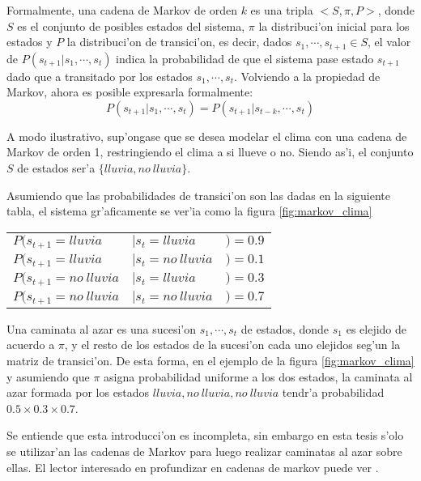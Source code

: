 Formalmente, una cadena de Markov de orden $k$ es una tripla $<S,\pi, P>$, donde $S$ es el conjunto de posibles estados del sistema, $\pi$ la distribuci'on
inicial para los estados y $P$ la 
distribuci'on de transici'on, es decir, dados $s_1, \cdots, s_{t+1} \in S$, el valor de $P(s_{t+1} | s_1, \cdots, s_t)$ indica la probabilidad
de que el sistema pase estado $s_{t+1}$ dado que a transitado por los estados $s_1, \cdots, s_t$. 
Volviendo a la propiedad de Markov, ahora es posible expresarla formalmente: $$P(s_{t+1}|s_1,\cdots,s_t) = P(s_{t+1} | s_{t-k}, \cdots, s_t)$$

A modo ilustrativo, sup'ongase que se desea modelar el clima con una cadena de Markov de orden 1, restringiendo el clima a si llueve o no. Siendo as'i, el conjunto 
$S$ de estados ser'a $\{lluvia, no\ lluvia\}$. 

Asumiendo que las probabilidades de transici'on son las dadas en la siguiente tabla, el sistema gr'aficamente se ver'ia como la figura \ref{fig:markov_clima}

\begin{center}
\label{tabla_markov}
\begin{tabular}{l l l}
$P(s_{t+1} = lluvia $ & $| s_t = lluvia $ & $)=0.9$ \\
$P(s_{t+1} = lluvia $ & $|s_t= no\ lluvia $& $)=0.1$\\
$P(s_{t+1} = no\ lluvia $ & $| s_t= lluvia  $ & $)=0.3$ \\
$P(s_{t+1} = no\ lluvia $ & $|s_t= no\ lluvia $ & $)=0.7$\\
\end{tabular}
\end{center}

\begin{imagen}
    \width{5cm}
\end{imagen}

Una caminata al azar es una sucesi'on $s_1, \cdots, s_t$ de estados, donde $s_1$ es elejido de acuerdo a $\pi$, 
y el resto de los estados de la sucesi'on cada uno elejidos seg'un la matriz de transici'on. De esta forma, en el ejemplo de la figura \ref{fig:markov_clima} y asumiendo 
que $\pi$ asigna probabilidad uniforme a los dos estados, la caminata al azar formada por los estados $lluvia, no\ lluvia, no\ lluvia$ tendr'a probabilidad $0.5\times0.3\times0.7$. 

Se entiende que esta introducci'on es incompleta, sin embargo en esta tesis s'olo se utilizar'an las cadenas de Markov para luego realizar 
caminatas al azar sobre ellas. El lector interesado en profundizar en cadenas de markov puede ver \cite{Rabiner90}.


